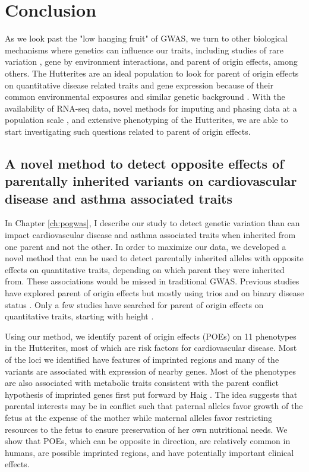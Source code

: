 \chapter{Conclusion}

As we look past the "low hanging fruit" of GWAS, we turn to other biological mechanisms where genetics can influence our traits, including studies of rare variation \citep{Igartua:2017ir,Li:2017bq}, gene by environment interactions, and parent of origin effects, among others. The Hutterites are an ideal population to look for parent of origin effects on quantitative disease related traits and gene expression because of their common environmental exposures and similar genetic background \cite{Weiss:2005cq,Abney2001,Ober:2001dy}. With the availability of RNA-seq data, novel methods for imputing and phasing data at a population scale \citep {Livne2015}, and extensive phenotyping of the Hutterites, we are able to start investigating such questions related to parent of origin effects. 



\section{A novel method to detect opposite effects of parentally inherited variants on cardiovascular disease and asthma associated traits}
 
 In Chapter \ref{ch:pogwas}, I describe our study to detect genetic variation than can impact cardiovascular disease and asthma associated traits when inherited from one parent and not the other. In order to maximize our data, we developed a novel method that can be used to detect parentally inherited alleles with opposite effects on quantitative traits, depending on which parent they were inherited from. These associations would be missed in traditional GWAS. Previous studies have explored parent of origin effects but mostly using trios \cite{Garg2012a,Ainsworth:2010bp,Howey:2012hj} and on binary disease status \cite{Kong:2009kk,Ainsworth:2010bp}. Only a few studies have searched for parent of origin effects on quantitative traits, starting with height \cite{Benonisdottir:2016dz,Zoledziewska:2015do}.
 
Using our method, we identify parent of origin effects (POEs) on 11 phenotypes in the Hutterites, most of which are risk factors for cardiovascular disease. Most of the loci we identified have features of imprinted regions and many of the variants are associated with expression of nearby genes. Most of the phenotypes are also associated with metabolic traits consistent with the parent conflict hypothesis of imprinted genes first put forward by Haig \citep{Haig:2000if,Barlow:2014dv,Patten:2016cb}. The idea suggests that parental interests may be in conflict such that paternal alleles favor growth of the fetus at the expense of the mother while maternal alleles favor restricting resources to the fetus to ensure preservation of her own nutritional needs. We show that POEs, which can be opposite in direction, are relatively common in humans, are possible imprinted regions, and have potentially important clinical effects. 
 
